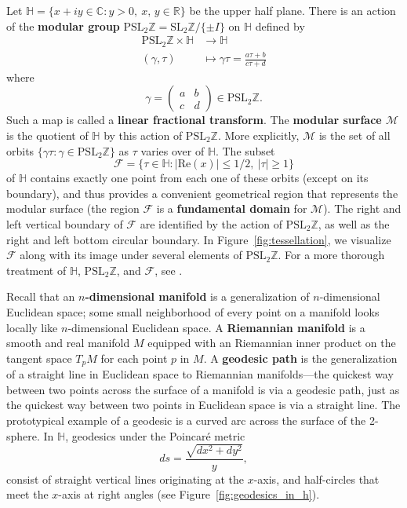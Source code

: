 \documentclass[12pt,twoside]{reedthesis}
\theoremstyle{definition}
\newcommand{\Z}{\mathbb{Z}}
\newcommand{\R}{\mathbb{R}}
\newcommand{\C}{\mathbb{C}}
\renewcommand{\H}{\mathbb{H}}
\newcommand{\SLZ}{\mathrm{SL}_2{\Z}}
\newcommand{\PSLZ}{\mathrm{PSL}_2{\Z}}
\newcommand{\defnphrase}[1]{\textbf{#1}}
\begin{document}
Let $\mathbb{H} = \{ x + i y \in \C : y > 0,\ x,\, y \in \R \}$ be the upper half plane.
There is an action of the \defnphrase{modular group} $\PSLZ = \SLZ / \{ \pm I \}$ on $\mathbb{H}$ defined by
\begin{align*}
  \PSLZ \times \mathbb{H} &\to \mathbb{H} \\
  (\gamma, \tau) &\mapsto \gamma\tau = \frac{a \tau + b}{c \tau + d}
\end{align*}
where
\begin{equation*}
  \gamma = \begin{pmatrix}
  a & b \\
  c & d
  \end{pmatrix} \in \PSLZ.
\end{equation*}
Such a map is called a \defnphrase{linear fractional transform}.
The \defnphrase{modular surface $\mathcal{M}$} is the quotient of $\mathbb{H}$ by this action of $\PSLZ$.
More explicitly, $\mathcal{M}$ is the set of all orbits $\{ \gamma \tau : \gamma \in \PSLZ \}$ as $\tau$ varies over of $\mathbb{H}$.
The subset
\begin{equation*}
  \mathcal{F} = \{ \tau \in \mathbb{H} : |\mathrm{Re}(x)| \leq 1/2,\ |\tau| \geq 1 \}
\end{equation*}
of $\mathbb{H}$ contains exactly one point from each one of these orbits (except on its boundary), and thus provides a convenient geometrical region that represents the modular surface (the region $\mathcal{F}$ is a \defnphrase{fundamental domain} for $\mathcal{M}$).
The right and left vertical boundary of $\mathcal{F}$ are identified by the action of $\PSLZ$, as well as the right and left bottom circular boundary.
In Figure~\ref{fig:tessellation}, we visualize $\mathcal{F}$ along with its image under several elements of $\PSLZ$.
For a more thorough treatment of $\mathbb{H}$, $\PSLZ$, and $\mathcal{F}$, see \cite{katok1992}.

Recall that an \defnphrase{$n$-dimensional manifold} is a generalization of $n$-dimensional Euclidean space; some small neighborhood of every point on a manifold looks locally like $n$-dimensional Euclidean space.
A \defnphrase{Riemannian manifold} is a smooth and real manifold $M$ equipped with an Riemannian inner product on the tangent space $T_pM$ for each point $p$ in $M$.
A \defnphrase{geodesic path} is the generalization of a straight line in Euclidean space to Riemannian manifolds---the quickest way between two points across the surface of a manifold is via a geodesic path, just as the quickest way between two points in Euclidean space is via a straight line.
The prototypical example of a geodesic is a curved arc across the surface of the 2-sphere.
In $\H$, geodesics under the Poincar\'e metric
\begin{equation*}
  ds = \frac{\sqrt{dx^2 + dy^2}}{y},
\end{equation*}
consist of straight vertical lines originating at the $x$-axis, and half-circles that meet the $x$-axis at right angles (see Figure~\ref{fig:geodesics_in_h}).
\end{document}
